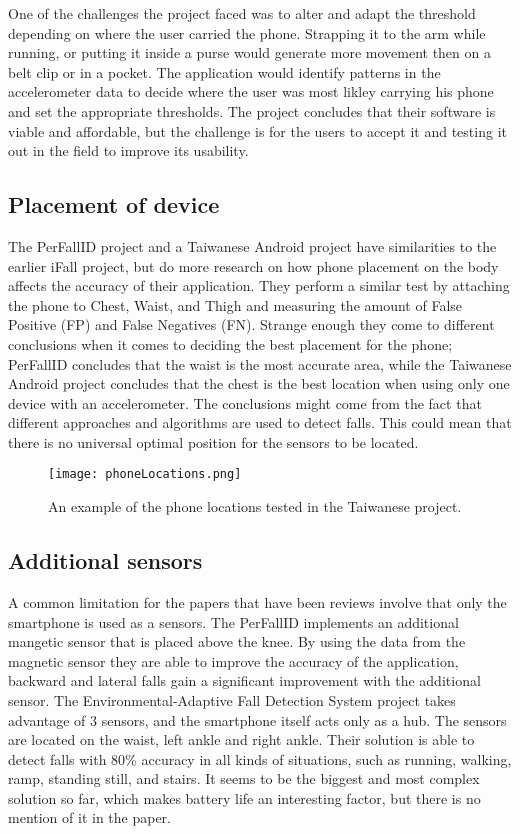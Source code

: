 One of the challenges the project faced was to alter and adapt the threshold depending on where the user carried the phone. Strapping it to the arm while running, or putting it inside a purse would generate more movement then on a belt clip or in a pocket. The application would identify patterns in the accelerometer data to decide where the user was most likley carrying his phone and set the appropriate thresholds. The project concludes that their software is viable and affordable, but the challenge is for the users to accept it and testing it out in the field to improve its usability.

\subsection{Placement of device}

The PerFallID\cite{fallPrevention} project and a Taiwanese Android\cite{mobilePhoneBasedFallDetection} project have similarities to the earlier iFall project, but do more research on how phone placement on the body affects the accuracy of their application. They perform a similar test by attaching the phone to Chest, Waist, and Thigh and measuring the amount of False Positive (FP) and False Negatives (FN). Strange enough they come to different conclusions when it comes to deciding the best placement for the phone; PerFallID concludes that the waist is the most accurate area, while the Taiwanese Android project concludes that the chest is the best location when using only one device with an accelerometer. The conclusions might come from the fact that different approaches and algorithms are used to detect falls. This could mean that there is no universal optimal position for the sensors to be located.

\begin{figure}[h!]
  \centering
    \texttt{[image: phoneLocations.png]}
    \caption{\footnotesize An example of the phone locations tested in the Taiwanese project.} 
\end{figure}

\subsection{Additional sensors}
A common limitation for the papers that have been reviews involve that only the smartphone is used as a sensors. The PerFallID implements an additional mangetic sensor that is placed above the knee. By using the data from the magnetic sensor they are able to improve the accuracy of the application, backward and lateral falls gain a significant improvement with the additional sensor. The Environmental-Adaptive Fall Detection System \cite{fallDetectionWithExtraSensors} project takes advantage of 3 sensors, and the smartphone itself acts only as a hub. The sensors are located on the waist, left ankle and right ankle. Their solution is able to detect falls with 80\% accuracy in all kinds of situations, such as running, walking, ramp, standing still, and stairs. It seems to be the biggest and most complex solution so far, which makes battery life an interesting factor, but there is no mention of it in the paper.

